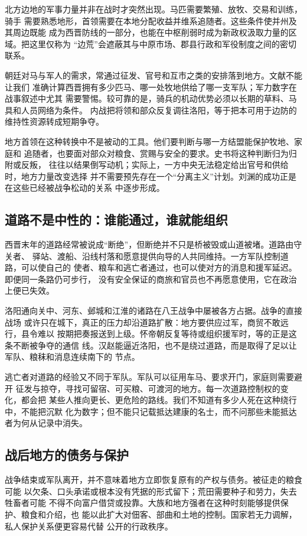 北方边地的军事力量并非在战时才突然出现。马匹需要繁殖、放牧、交易和训练，骑手
需要熟悉地形，首领需要在本地分配收益并维系追随者。这些条件使并州及其周边既能
成为西晋防线的一部分，也能在中枢削弱时成为新政权汲取力量的区域。把这里仅称为
“边荒”会遮蔽其与中原市场、郡县行政和军役制度之间的密切联系。

朝廷对马与军人的需求，常通过征发、官号和互市之类的安排落到地方。文献不能让我们
准确计算西晋拥有多少匹马、哪一处牧地供给了哪一支军队；军力数字在战事叙述中尤其
需要警惕。较可靠的是，骑兵的机动优势必须以长期的草料、马具和人员网络为条件。
内战把将领和部众反复调往洛阳，等于把本可用于边防的维持性资源转成短期争夺。

地方首领在这种转换中不是被动的工具。他们要判断与哪一方结盟能保护牧地、家庭和
追随者，也要面对部众对粮食、赏赐与安全的要求。史书将这种判断归为归附或反叛，
往往以结果倒写动机；实际上，一方中央无法稳定给出官号和供给时，地方力量改变选择
并不需要预先存在一个“分离主义”计划。刘渊的成功正是在这些已经被战争松动的关系
中逐步形成。

\subsection{道路不是中性的：谁能通过，谁就能组织}

西晋末年的道路经常被说成“断绝”，但断绝并不只是桥被毁或山道被堵。道路由守关者、
驿站、渡船、沿线村落和愿意提供向导的人共同维持。一方军队控制道路，可以使自己的
使者、粮车和逃亡者通过，也可以使对方的消息和援军延迟。即便同一条路仍可步行，
没有安全保证的商旅和官员也不再愿意使用，它在政治上便已失效。

洛阳通向关中、河东、邺城和江淮的诸路在八王战争中屡被各方占据。战争的直接战场
或许只在城下，真正的压力却沿道路扩散：地方要供应过军，商贸不敢远行，县令难以
按期把奏报送到上级。怀帝朝反复等待或组织援军时，等的正是这条不断被争夺的通信
线。汉赵能逼近洛阳，也不是绕过道路，而是取得了足以让军队、粮秣和消息连续南下的
节点。

逃亡者对道路的经验又不同于军队。军队可以征用车马、要求开门，家庭则需要避开
征发与掠夺，寻找可留宿、可买粮、可渡河的地方。每一次道路控制权的变化，都会把
某些人推向更长、更危险的路线。我们不知道有多少人死在这种绕行中，不能把沉默
化为数字；但不能只记载抵达建康的名士，而不问那些未能抵达者为何从记录中消失。

\subsection{战后地方的债务与保护}

战争结束或军队离开，并不意味着地方立即恢复原有的产权与债务。被征走的粮食可能
以欠条、口头承诺或根本没有凭据的形式留下；荒田需要种子和劳力，失去牲畜者可能
不得不向富户借贷或投靠。大族和地方强者在这种时刻能够提供保护、粮食和介绍，也
能以此扩大对佃客、部曲和土地的控制。国家若无力调解，私人保护关系便更容易代替
公开的行政秩序。

